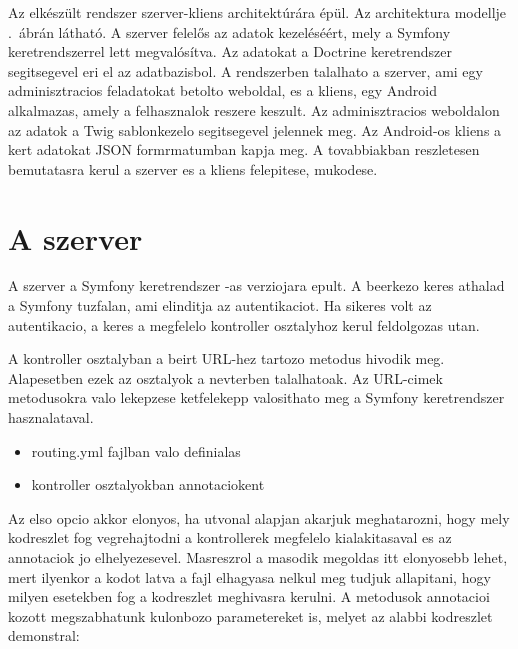 ﻿Az elkészült rendszer szerver-kliens architektúrára épül.
Az architektura modellje .\ ábrán látható. 
A szerver felelős az adatok kezeléséért, mely a Symfony keretrendszerrel lett megvalósítva. %
Az adatokat a Doctrine keretrendszer segitsegevel eri el az adatbazisbol. 
A rendszerben talalhato a szerver, ami egy adminisztracios feladatokat betolto weboldal, es a kliens, egy Android alkalmazas, amely a felhasznalok reszere keszult. 
Az adminisztracios weboldalon az adatok a Twig sablonkezelo segitsegevel jelennek meg. 
Az Android-os kliens a kert adatokat JSON formrmatumban kapja meg. 
A tovabbiakban reszletesen bemutatasra kerul a szerver es a kliens felepitese, mukodese. 


\section{A szerver}
\label{szerverfelepites}

A szerver a Symfony keretrendszer -as verziojara epult. 
A beerkezo keres athalad a Symfony tuzfalan, ami elinditja az autentikaciot. 
Ha sikeres volt az autentikacio, a keres a megfelelo kontroller osztalyhoz kerul feldolgozas utan. 


A kontroller osztalyban a beirt URL-hez tartozo metodus hivodik meg. 
Alapesetben ezek az osztalyok a  nevterben talalhatoak. 
Az URL-cimek metodusokra valo lekepzese ketfelekepp valosithato meg a Symfony keretrendszer hasznalataval. 

\begin{itemize}
	\item routing.yml fajlban valo definialas
	\item kontroller osztalyokban annotaciokent
\end{itemize}

Az elso opcio akkor elonyos, ha utvonal alapjan akarjuk meghatarozni, hogy mely kodreszlet fog vegrehajtodni a kontrollerek megfelelo kialakitasaval es az annotaciok jo elhelyezesevel. 
Masreszrol a masodik megoldas itt elonyosebb lehet, mert ilyenkor a kodot latva a fajl elhagyasa nelkul meg tudjuk allapitani, hogy milyen esetekben fog a kodreszlet meghivasra kerulni. 
A metodusok annotacioi kozott megszabhatunk kulonbozo parametereket is, melyet az alabbi kodreszlet demonstral:

